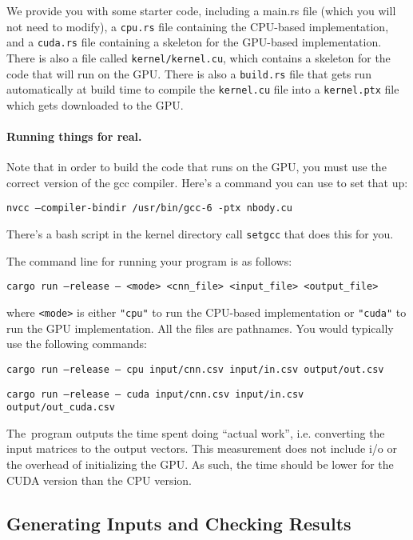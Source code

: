 We provide you with some starter code, including a main.rs file (which you will not need to modify), a \texttt{cpu.rs} file containing the CPU-based implementation, and a \texttt{cuda.rs} file containing a skeleton for the GPU-based implementation. There is also a file called \texttt{kernel/kernel.cu}, which contains a skeleton for the code that will run on the GPU. There is also a \texttt{build.rs} file that gets run automatically at build time to compile the \texttt{kernel.cu} file into a \texttt{kernel.ptx} file which gets downloaded to the GPU.


\paragraph{Running things for real.}
Note that in order to build the code that runs on the GPU, you must use the correct version of the gcc compiler. Here's a command you can use to set that up:

\texttt{nvcc --compiler-bindir /usr/bin/gcc-6 -ptx nbody.cu}


There's a bash script in the kernel directory call \texttt{setgcc} that does this for you.

The command line for running your program is as follows:


\texttt{cargo run --release -- <mode> <cnn\_file> <input\_file> <output\_file>}


where \texttt{<mode>} is either \texttt{"cpu"} to run the CPU-based implementation or \texttt{"cuda"} to run the GPU implementation. All the files are pathnames. You would typically use the following commands:



\texttt{cargo run --release -- cpu input/cnn.csv input/in.csv output/out.csv}

\texttt{cargo run --release -- cuda input/cnn.csv input/in.csv output/out\_cuda.csv}


The\ program outputs the time spent doing ``actual work'', i.e. converting the input matrices to the output vectors.  This measurement does not include i/o or the overhead of initializing the GPU. As such, the time should be lower for the CUDA version than the CPU version.




\subsection*{Generating Inputs and Checking Results}




